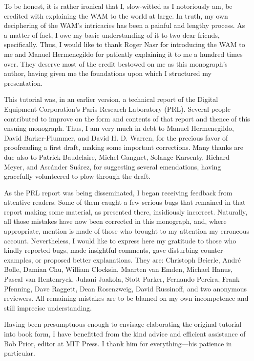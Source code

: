 To be honest, it is rather ironical that I, slow-witted as I notoriously am, be credited
with explaining the WAM to the world at large. In truth, my own deciphering of
the WAM’s intricacies has been a painful and lengthy process. As a matter of
fact, I owe my basic understanding of it to two dear friends, specifically. Thus,
I would like to thank Roger Nasr for introducing the WAM to me and Manuel
Hermenegildo for patiently explaining it to me a hundred times over. They deserve
most of the credit bestowed on me as this monograph’s author, having given me
the foundations upon which I structured my presentation.

This tutorial was, in an earlier version, a technical report of the Digital Equipment
Corporation’s Paris Research Laboratory (PRL). Several people contributed
to improve on the form and contents of that report and thence of this ensuing
monograph. Thus, I am very much in debt to Manuel Hermenegildo, David
Barker-Plummer, and David H. D. Warren, for the precious favor of proofreading
a first draft, making some important corrections. Many thanks are due also
to Patrick Baudelaire, Michel Gangnet, Solange Karsenty, Richard Meyer, and
Asc\'ander Su\'arez, for suggesting several emendations, having gracefully
volunteered to plow through the draft.

As the PRL report was being disseminated, I began receiving feedback from attentive
readers. Some of them caught a few serious bugs that remained in that
report making some material, as presented there, insidiously incorrect. Naturally,
all those mistakes have now been corrected in this monograph, and, where appropriate,
mention is made of those who brought to my attention my erroneous account.
Nevertheless, I would like to express here my gratitude to those who kindly
reported bugs, made insightful comments, gave disturbing counter-examples, or
proposed better explanations. They are: Christoph Beierle, Andr\'e Bolle,
Damian Chu, William Clocksin, Maarten van Emden, Michael Hanus, Pascal van Hentenryck,
Juhani Jaakola, Stott Parker, Fernando Pereira, Frank Pfenning, Dave
Raggett, Dean Rosenzweig, David Russinoff, and two anonymous reviewers. All
remaining mistakes are to be blamed on my own incompetence and still imprecise
understanding.

Having been presumptuous enough to envisage elaborating the original tutorial
into book form, I have benefitted from the kind advice and efficient assistance
of Bob Prior, editor at MIT Press. I thank him for everything—his patience in
particular.

